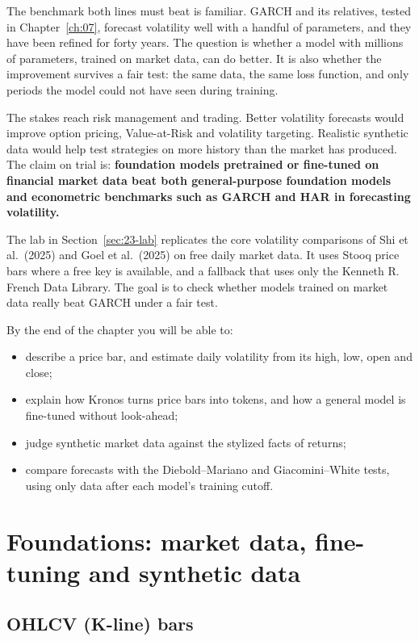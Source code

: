 The benchmark both lines must beat is familiar. GARCH and its relatives, tested in Chapter~\ref{ch:07}, forecast volatility well with a handful of parameters, and they have been refined for forty years. The question is whether a model with millions of parameters, trained on market data, can do better. It is also whether the improvement survives a fair test: the same data, the same loss function, and only periods the model could not have seen during training.

The stakes reach risk management and trading. Better volatility forecasts would improve option pricing, Value-at-Risk and volatility targeting. Realistic synthetic data would help test strategies on more history than the market has produced. The claim on trial is: \textbf{foundation models pretrained or fine-tuned on financial market data beat both general-purpose foundation models and econometric benchmarks such as GARCH and HAR in forecasting volatility.}

The lab in Section~\ref{sec:23-lab} replicates the core volatility comparisons of Shi et al.\ (2025) and Goel et al.\ (2025) on free daily market data. It uses Stooq price bars where a free key is available, and a fallback that uses only the Kenneth R. French Data Library. The goal is to check whether models trained on market data really beat GARCH under a fair test.

By the end of the chapter you will be able to:

\begin{itemize}
  \item describe a price bar, and estimate daily volatility from its high, low, open and close;
  \item explain how Kronos turns price bars into tokens, and how a general model is fine-tuned without look-ahead;
  \item judge synthetic market data against the stylized facts of returns;
  \item compare forecasts with the Diebold--Mariano and Giacomini--White tests, using only data after each model's training cutoff.
\end{itemize}


\section{Foundations: market data, fine-tuning and synthetic data}
\label{sec:23-foundations}

\subsection{OHLCV (K-line) bars}


